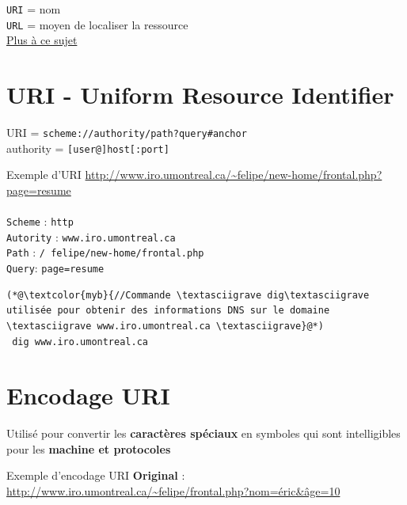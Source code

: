 \documentclass{report}
\begin{document}
\begin{multicols*}{3}
\begin{note}{}{}
\texttt{URI} = nom \\
\texttt{URL} = moyen de localiser la ressource \\

\textcolor{myb}{ \href{https://www.w3.org/Addressing/URL/uri-spec.html}{Plus à ce sujet}} 
\end{note}



\section{URI - Uniform Resource Identifier}
\noindent
URI = \texttt{\textcolor{myb}{scheme}://\textcolor{myp}{authority}\slash\textcolor{myb}{path?}\textcolor{myp}{query}\#\textcolor{myb}{anchor}} \\
authority = \texttt{[user@]host[:port]}

\begin{EExample}{Exemple d'URI}{}
     \url{http://www.iro.umontreal.ca/~felipe/new-home/frontal.php?page=resume} \\\\
    \texttt{Scheme} : \texttt{http}  \\
    \texttt{Autority} : \texttt{www.iro.umontreal.ca} \\
    \texttt{Path} : \texttt{/~felipe/new-home/frontal.php} \\
    \texttt{Query}: \texttt{page=resume}   
\end{EExample}



\begin{EExample}{}{}
\begin{lstlisting}
(*@\textcolor{myb}{//Commande \textasciigrave dig\textasciigrave utilisée pour obtenir des informations DNS sur le domaine \textasciigrave www.iro.umontreal.ca \textasciigrave}@*)
 dig www.iro.umontreal.ca   
\end{lstlisting}
\end{EExample}



\section{Encodage URI}
Utilisé pour convertir les \textbf{caractères spéciaux} en symboles qui sont intelligibles pour les \textbf{machine et protocoles}  
\begin{EExample}{Exemple d'encodage URI}{}
\textbf{Original} : \\   
\url{http://www.iro.umontreal.ca/~felipe/frontal.php?nom=éric&âge=10} \\ \\


\end{EExample}
\end{multicols*}
\end{document}
